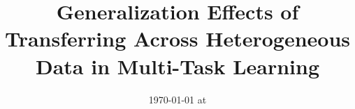 \documentclass{article}
\begin{document}
\title{Generalization Effects of Transferring Across Heterogeneous Data in Multi-Task Learning}
\date{}
\maketitle
\date{{\ddmmyyyydate\today} at \currenttime}




%

%





\appendix







\end{document}
